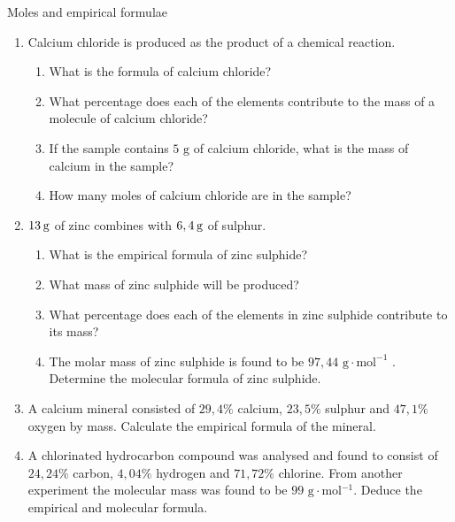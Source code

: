             \begin{exercises}{Moles and empirical formulae
      }
            \nopagebreak \noindent
      \label{m38712*id281924}\begin{enumerate}[noitemsep, label=\textbf{\arabic*}. ] 
            \label{m38712*uid73}\item Calcium chloride is produced as the product of a chemical reaction.
\label{m38712*id281940}\begin{enumerate}[noitemsep, label=\textbf{\alph*}. ] 
            \label{m38712*uid74}\item What is the formula of calcium chloride?
\label{m38712*uid75}\item What percentage does each of the elements contribute to the mass of a molecule of calcium chloride?
\label{m38712*uid76}\item If the sample contains $5 \text{ g}$ of calcium chloride, what is the mass of calcium in the sample?
\label{m38712*uid77}\item How many moles of calcium chloride are in the sample?
\end{enumerate}
                \label{m38712*uid78}\item $13\phantom{\rule{2pt}{0ex}}\text{g}$ of zinc combines with $6,4\phantom{\rule{2pt}{0ex}}\text{g}$ of sulphur.
\label{m38712*id282007}\begin{enumerate}[noitemsep, label=\textbf{\alph*}. ] 
\item  What is the empirical formula of zinc sulphide?
            \label{m38712*uid79}\item What mass of zinc sulphide will be produced?
\label{m38712*uid80}\item What percentage does each of the elements in zinc sulphide contribute to its mass?
\label{m38712*uid81}\item The molar mass of zinc sulphide is found to be $97,44 \text{ g} \cdot \text{mol}^{−1}$ . Determine the molecular formula of zinc sulphide.
\end{enumerate}
                \label{m38712*uid82}\item A calcium mineral consisted of $29,4\%$ calcium, $23,5\%$ sulphur and $47,1\%$ oxygen by mass. Calculate the empirical formula of the mineral.\newline
\label{m38712*uid83}\item A chlorinated hydrocarbon compound was analysed and found to consist of $24,24\%$ carbon, $4,04\%$ hydrogen and $71,72\%$ chlorine. From another experiment the molecular mass was found to be $99\text{ g} \cdot \text{mol}{}^{-1}$. Deduce the empirical and molecular formula.\newline

\end{enumerate}
\end{exercises}
